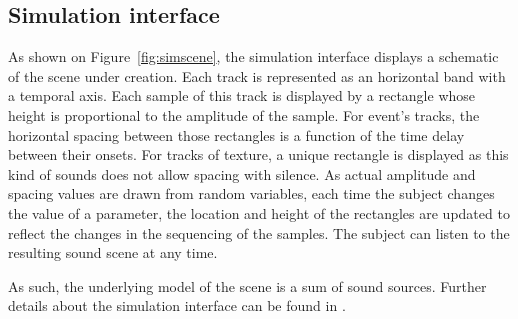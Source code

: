 \documentclass[preprint,12pt]{elsarticle}
\newcommand{\cf}{cf.}
\begin{document}
\subsection{Simulation interface}


As shown on Figure~\ref{fig:simscene}, the simulation interface displays a schematic of the scene under creation. Each track is represented as an horizontal band with a temporal axis. Each sample of this track is displayed by a rectangle whose height is proportional to the amplitude of the sample. For event's tracks, the horizontal spacing between those rectangles is a function of the time delay between their onsets. For tracks of texture, a unique rectangle is displayed as this kind of sounds does not allow spacing with silence. As actual amplitude and spacing values are drawn from random variables, each time the subject changes the value of a parameter, the location and height of the rectangles are updated to reflect the changes in the sequencing of the samples. The subject can listen to the resulting sound scene at any time.


As such, the underlying model of the scene is a sum of sound sources. Further details about the simulation interface can be found in \cite{rossignol2015simscene}.


\end{document}
